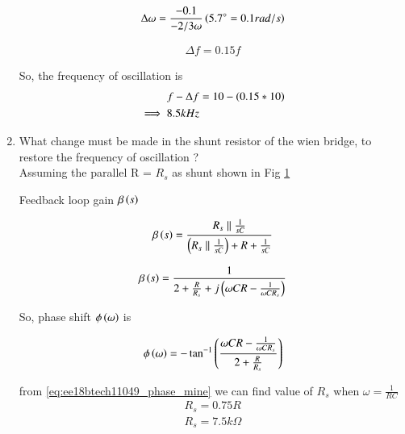 \begin{enumerate}[label=\arabic*.,ref=\theenumi]
\begin{align}
\label{eq:ee18btech11049_freq}
    \Delta\omega = \frac{-0.1}{ -2/3\omega} \brak{ 5.7\degree = 0.1 rad/s }
\end{align}

\begin{align}
\label{eq:ee18btech11049_freq}
    \Delta f = 0.15f
\end{align}

%
So, the frequency of oscillation is 
\begin{align}
\label{eq:ee18btech11049_freq}
    f - \Delta f &= 10-\brak{0.15*10}\\ 
    \implies 8.5 kHz
\end{align}

\item What change must be made in the shunt resistor of the wien bridge, to restore the frequency of oscillation ? \\
\solution Assuming the parallel R = $R_s$ as shunt shown in Fig \ref{fig:ee18btech11049_fig2}

\begin{figure}[!ht]
	\begin{center}
		\resizebox{\columnwidth}{!}{}
	\end{center}
\caption{}
\label{fig:ee18btech11049_fig2}
\end{figure}

Feedback loop gain $\beta\left(s\right)$

\begin{align}
\label{eq:ee18btech11049_beta}
    \beta\brak{s} = \frac{R_s \parallel \frac{1}{sC}}{\brak{R_s \parallel \frac{1}{sC}} + R + \frac{1}{sC}}
\end{align}

\begin{align}
\label{eq:ee18btech11049_freq}
    \beta\brak{s} = \frac{1}{2 + \frac{R}{R_s} + j\brak{\omega CR - \frac{1}{\omega CR_s}}}
\end{align}

So, phase shift $\phi\left(\omega\right)$ is

\begin{align}
\label{eq:ee18btech11049_phase_mine}
    \phi\brak{\omega}  = -\tan^{-1}\brak{\frac{\omega CR - \frac{1}{\omega CR_s}}{2+\frac{R}{R_s}}}
\end{align}

from \ref{eq:ee18btech11049_phase_mine} we can find value of $R_s$ when $\omega = \frac{1}{RC}$ 
\begin{align}
   R_s = 0.75R \\
   R_s = 7.5k\Omega 
\end{align}



\end{enumerate}
